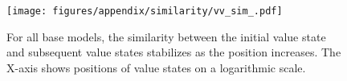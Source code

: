 \begin{figure}[ht]
    \centering
    \texttt{[image: figures/appendix/similarity/vv\_sim\_.pdf]}
    \caption{For all base models, the similarity between the initial value state and subsequent value states stabilizes as the position increases. The X-axis shows positions of value states on a logarithmic scale.} 
    \label{fig:app:sim:vv}
\end{figure}